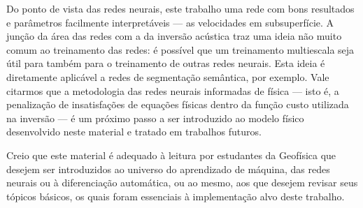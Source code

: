   Do ponto de vista das redes neurais, este trabalho \DIFdelbegin {}\DIFdelend \DIFaddbegin {}\DIFaddend uma rede com bons resultados e parâmetros facilmente interpretáveis --- as velocidades em subsuperfície. A junção da área das redes com a da inversão acústica traz uma ideia não muito comum ao treinamento das redes: é possível que um treinamento multiescala seja útil para também para o treinamento de outras redes neurais. Esta ideia é diretamente aplicável a redes de segmentação semântica, por exemplo. Vale citarmos que a metodologia das redes neurais informadas de física --- isto é, a penalização de insatisfações de equações físicas dentro da função custo utilizada na inversão --- é um próximo passo a ser introduzido ao modelo físico desenvolvido neste material e tratado em trabalhos futuros.

  Creio que este material é adequado à leitura por estudantes da Geofísica que desejem ser introduzidos ao universo do aprendizado de máquina, das redes neurais ou à diferenciação automática, ou ao mesmo, aos que desejem revisar seus tópicos básicos, os quais foram essenciais à implementação alvo deste trabalho.
